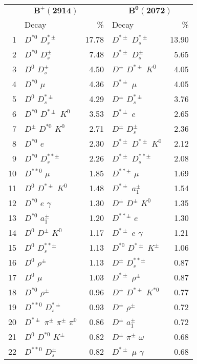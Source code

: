 \documentclass[6pt]{article}
\begin{document}
\begin{tabular}{rlr|lr}
\multicolumn{3}{c|}{$\boldsymbol{B^+(2914)}$} & \multicolumn{2}{c}{$\boldsymbol{B^0(2072)}$} \\
& Decay & \% & Decay & \% \\ \hline \hline
1 & $D^{*0}$ $D_s^{*\pm}$ & 17.78 & $D^{*\pm}$ $D_s^{*\pm}$ & 13.90 \\
2 & $D^{*0}$ $D_s^{\pm}$ & 7.48 & $D^{*\pm}$ $D_s^{\pm}$ & 5.65 \\
3 & $D^0$ $D_s^{\pm}$ & 4.50 & $D^{\pm}$ $D^{*\pm}$ $K^0$ & 4.05 \\
4 & $D^{*0}$ $\mu$ & 4.36 & $D^{*\pm}$ $\mu$ & 4.05 \\
5 & $D^0$ $D_s^{*\pm}$ & 4.29 & $D^{\pm}$ $D_s^{*\pm}$ & 3.76 \\
6 & $D^{*0}$ $D^{*\pm}$ $K^0$ & 3.53 & $D^{*\pm}$ $e$ & 2.65 \\
7 & $D^{\pm}$ $D^{*0}$ $K^0$ & 2.71 & $D^{\pm}$ $D_s^{\pm}$ & 2.36 \\
8 & $D^{*0}$ $e$ & 2.30 & $D^{*\pm}$ $D^{*\pm}$ $K^0$ & 2.12 \\
9 & $D^{*0}$ $D_s^{**\pm}$ & 2.26 & $D^{*\pm}$ $D_s^{**\pm}$ & 2.08 \\
10 & $D^{**0}$ $\mu$ & 1.85 & $D^{**\pm}$ $\mu$ & 1.69 \\
11 & $D^0$ $D^{*\pm}$ $K^0$ & 1.48 & $D^{*\pm}$ $a_1^{\pm}$ & 1.54 \\
12 & $D^{*0}$ $e$ $\gamma$ & 1.30 & $D^{\pm}$ $D^{\pm}$ $K^0$ & 1.35 \\
13 & $D^{*0}$ $a_1^{\pm}$ & 1.20 & $D^{**\pm}$ $e$ & 1.30 \\
14 & $D^0$ $D^{\pm}$ $K^0$ & 1.17 & $D^{*\pm}$ $e$ $\gamma$ & 1.21 \\
15 & $D^0$ $D_s^{**\pm}$ & 1.13 & $D^{*0}$ $D^{*\pm}$ $K^{\pm}$ & 1.06 \\
16 & $D^0$ $\rho^{\pm}$ & 1.13 & $D^{\pm}$ $D_s^{**\pm}$ & 0.87 \\
17 & $D^0$ $\mu$ & 1.03 & $D^{*\pm}$ $\rho^{\pm}$ & 0.87 \\
18 & $D^{*0}$ $\rho^{\pm}$ & 0.96 & $D^{\pm}$ $D^{*\pm}$ $K^{*0}$ & 0.77 \\
19 & $D^{**0}$ $D_s^{*\pm}$ & 0.93 & $D^{\pm}$ $\rho^{\pm}$ & 0.72 \\
20 & $D^{*\pm}$ $\pi^{\pm}$ $\pi^{\pm}$ $\pi^0$ & 0.86 & $D^{\pm}$ $a_1^{\pm}$ & 0.72 \\
21 & $D^0$ $D^{*0}$ $K^{\pm}$ & 0.82 & $D^{\pm}$ $\pi^{\pm}$ $\omega$ & 0.68 \\
22 & $D^{**0}$ $D_s^{\pm}$ & 0.82 & $D^{*\pm}$ $\mu$ $\gamma$ & 0.68 \\

\end{tabular}
\end{document}
